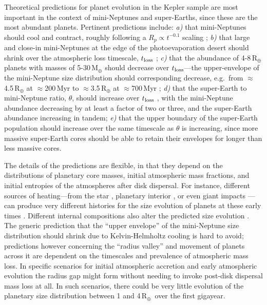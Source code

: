 \documentclass[11pt,twocolumn,tighten]{aastex63}
\newcommand{\rearth}{{R$_\oplus$}}
\begin{document}
Theoretical predictions for planet evolution in the Kepler sample are
most important in the context of mini-Neptunes and super-Earths, since
these are the most abundant planets.  Pertinent predictions include:
{\it a)} that mini-Neptunes should cool and contract, roughly
following a $R_p \propto t^{-0.1}$ scaling \citep{Gupta_2019}; {\it
b)} that large and close-in mini-Neptunes at the edge of the
photoevaporation desert should shrink over the atmospheric loss
timescale, $t_{\rm loss}$ \citep{Owen_Lai_2018}; {\it c)} that the
abundance of 4-8\,R$_\oplus$ planets with masses of 5-30\,M$_\oplus$
should decrease over $t_{\rm loss}$---the upper-envelope of the
mini-Neptune size distribution should corresponding decrease,
e.g.~from $\approx$4.5\,R$_\oplus$ at $\approx$200\,Myr to
$\approx$3.5\,R$_\oplus$ at $\approx$700\,Myr
\citep[e.g.][]{Rogers_2021}; {\it d)} that the super-Earth to
mini-Neptune ratio, $\theta$, should increase over $t_{\rm loss}$
\citep[e.g.][]{Rogers_2021}, with the mini-Neptune abundance
decreasing by at least a factor of two or three, and the super-Earth
abundance increasing in tandem; {\it e)} that the
upper boundary of the super-Earth population should increase over the
same timescale as $\theta$ is increasing, since more massive
super-Earth cores should be able to retain their envelopes for longer
than less massive cores.

The details of the predictions are flexible, in that they depend on
the distributions of planetary core masses, initial atmospheric mass
fractions, and initial entropies of the atmospheres after disk
dispersal.  For instance, different sources of heating---from the star
\citep{Owen_Wu_2013,Lopez_Fortney_2014,Jin_2014}, planetary interior
\citep{Gupta_2019}, or even giant impacts
\citep{Biersteker_Schlichting_2019}---can produce very different
histories for the size evolution of planets at these early times
\citep[e.g.][]{Owen_2020}.  Different internal compositions also alter
the predicted size evolution \citep[e.g.][]{2024NatAs.tmp...33B}.  The
generic prediction that the ``upper envelope'' of the mini-Neptune
size distribution should shrink due to Kelvin-Helmholtz cooling is
hard to avoid; predictions however concerning the ``radius valley''
and movement of planets across it are dependent on the timescales and
prevalence of atmospheric mass loss.  In specific scenarios for
initial atmospheric accretion \citep{Lee_2022} and early atmospheric
evolution \citep{2024MNRAS.529.2716R} the radius gap might form
without needing to invoke post-disk dispersal mass loss at all.  In
such scenarios, there could be very little evolution of the planetary
size distribution between 1 and 4\,\rearth\ over the first gigayear.
\end{document}

